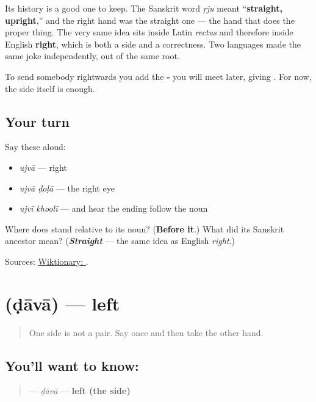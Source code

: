 Its history is a good one to keep. The Sanskrit word \emph{ṛju} meant \textquotedblleft{}\textbf{straight, upright},\textquotedblright{} and the right hand was the straight one — the hand that does the proper thing. The very same idea sits inside Latin \emph{rectus} and therefore inside English \textbf{right}, which is both a side and a correctness. Two languages made the same joke independently, out of the same root.

To send somebody rightwards you add the \textbf{-} you will meet later, giving \textbf{}. For now, the side itself is enough.

\subsection*{Your turn}
Say these aloud:

\begin{itemize}
\raggedright
  \item \emph{ujvā} — right
  \item \emph{ujvā ḍoḷā} — the right eye
  \item \emph{ujvī khoolī} — and hear the ending follow the noun
\end{itemize}

\begin{tcolorbox}[breakable,colback=teal!4,colframe=teal!35!black,title={Before you move on}]
Where does \textbf{} stand relative to its noun? (\textbf{Before it}.) What did its Sanskrit ancestor mean? (\emph{\textbf{Straight}} — the same idea as English \emph{right}.)

Sources: \href{https://en.wiktionary.org/wiki/\%E0\%A4\%89\%E0\%A4\%9C\%E0\%A4\%B5\%E0\%A4\%BE}{Wiktionary: }.
\end{tcolorbox}
\section[\texorpdfstring{\mr{डावा} (ḍāvā)}{डावा (ḍāvā)}]{ (ḍāvā) — left}

\label{lesson:MR-C44-daava}



\begin{quote}
One side is not a pair. Say \textbf{} once and then take the other hand.
\end{quote}

\subsection*{You'll want to know: }
\begin{quote}
\textbf{} — \emph{ḍāvā} — \textbf{left (the side)}
\end{quote}


